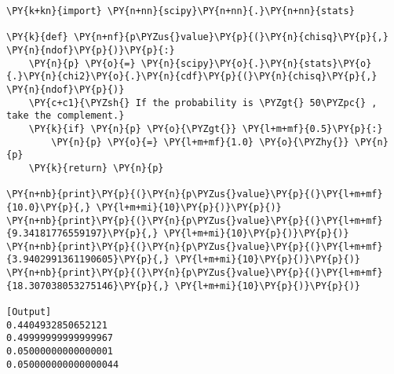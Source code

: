 \begin{Verbatim}[label=\makebox{\href{https://bitbucket.org/lbaldini/statnotes/src/master/snippets/p\_value.py}{https://bitbucket.org/.../p\_value.py}},commandchars=\\\{\}]
\PY{k+kn}{import} \PY{n+nn}{scipy}\PY{n+nn}{.}\PY{n+nn}{stats}

\PY{k}{def} \PY{n+nf}{p\PYZus{}value}\PY{p}{(}\PY{n}{chisq}\PY{p}{,} \PY{n}{ndof}\PY{p}{)}\PY{p}{:}
    \PY{n}{p} \PY{o}{=} \PY{n}{scipy}\PY{o}{.}\PY{n}{stats}\PY{o}{.}\PY{n}{chi2}\PY{o}{.}\PY{n}{cdf}\PY{p}{(}\PY{n}{chisq}\PY{p}{,} \PY{n}{ndof}\PY{p}{)}
    \PY{c+c1}{\PYZsh{} If the probability is \PYZgt{} 50\PYZpc{} , take the complement.}
    \PY{k}{if} \PY{n}{p} \PY{o}{\PYZgt{}} \PY{l+m+mf}{0.5}\PY{p}{:}
        \PY{n}{p} \PY{o}{=} \PY{l+m+mf}{1.0} \PY{o}{\PYZhy{}} \PY{n}{p}
    \PY{k}{return} \PY{n}{p}

\PY{n+nb}{print}\PY{p}{(}\PY{n}{p\PYZus{}value}\PY{p}{(}\PY{l+m+mf}{10.0}\PY{p}{,} \PY{l+m+mi}{10}\PY{p}{)}\PY{p}{)}
\PY{n+nb}{print}\PY{p}{(}\PY{n}{p\PYZus{}value}\PY{p}{(}\PY{l+m+mf}{9.34181776559197}\PY{p}{,} \PY{l+m+mi}{10}\PY{p}{)}\PY{p}{)}
\PY{n+nb}{print}\PY{p}{(}\PY{n}{p\PYZus{}value}\PY{p}{(}\PY{l+m+mf}{3.9402991361190605}\PY{p}{,} \PY{l+m+mi}{10}\PY{p}{)}\PY{p}{)}
\PY{n+nb}{print}\PY{p}{(}\PY{n}{p\PYZus{}value}\PY{p}{(}\PY{l+m+mf}{18.307038053275146}\PY{p}{,} \PY{l+m+mi}{10}\PY{p}{)}\PY{p}{)}

[Output]
0.4404932850652121
0.49999999999999967
0.05000000000000001
0.050000000000000044
\end{Verbatim}